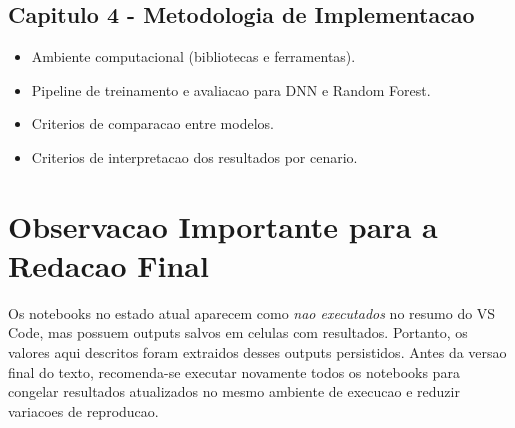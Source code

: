 \subsection{Capitulo 4 - Metodologia de Implementacao}
\begin{itemize}
\item Ambiente computacional (bibliotecas e ferramentas).
\item Pipeline de treinamento e avaliacao para DNN e Random Forest.
\item Criterios de comparacao entre modelos.
\item Criterios de interpretacao dos resultados por cenario.
\end{itemize}

\section{Observacao Importante para a Redacao Final}

Os notebooks no estado atual aparecem como \textit{nao executados} no resumo do VS Code, mas possuem outputs salvos em celulas com resultados. Portanto, os valores aqui descritos foram extraidos desses outputs persistidos. Antes da versao final do texto, recomenda-se executar novamente todos os notebooks para congelar resultados atualizados no mesmo ambiente de execucao e reduzir variacoes de reproducao.
